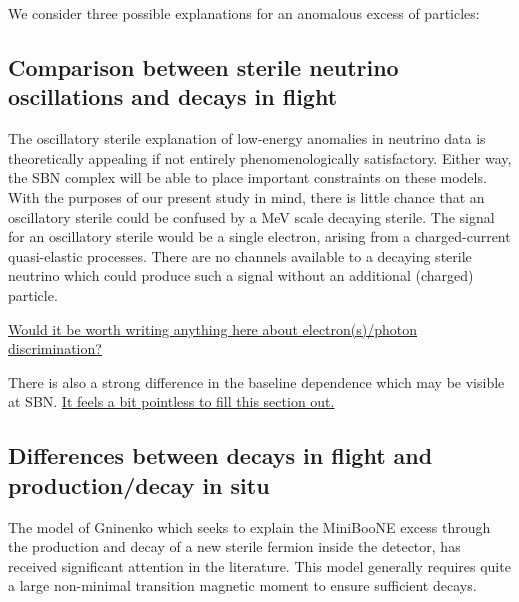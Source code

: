 \documentclass[11pt, a4paper]{article}
\newcommand{\newtext}[2]{\textcolor{#1}{\ul{#2}}}
\begin{document}
We consider three possible explanations for an anomalous excess of particles:

\subsection{Comparison between sterile neutrino oscillations and decays in flight}

The oscillatory sterile explanation of low-energy anomalies in neutrino data is
theoretically appealing if not entirely phenomenologically satisfactory. Either
way, the SBN complex will be able to place important constraints on these
models. With the purposes of our present study in mind, there is little chance
that an oscillatory sterile could be confused by a MeV scale decaying sterile.
The signal for an oscillatory sterile would be a single electron, arising from
a charged-current quasi-elastic processes. There are no channels available to a
decaying sterile neutrino which could produce such a signal without an
additional (charged) particle. 

\newtext{PB}{Would it be worth writing anything here about electron(s)/photon
discrimination?}

There is also a strong difference in the baseline dependence which may be
visible at SBN. \newtext{PB}{It feels a bit pointless to fill this section
out.}

\subsection{Differences between decays in flight and production/decay in situ}

The model of Gninenko \cite{Gninenko:2009ks,Gninenko:2010pr} which seeks to
explain the MiniBooNE excess through the production and decay of a new sterile
fermion inside the detector, has received significant attention in the
literature. This model generally requires quite a large non-minimal transition
magnetic moment to ensure sufficient decays. 
\end{document}
